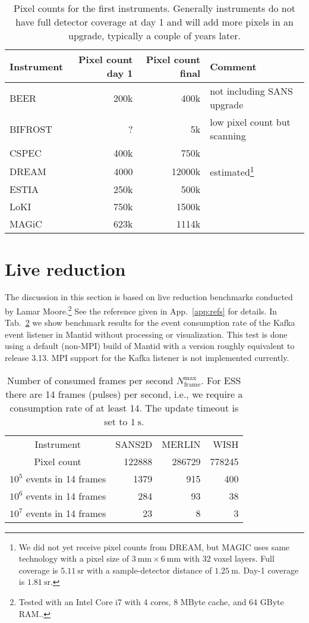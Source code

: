 \documentclass[a4paper,english,numbers=noenddot,bibliography=totoc,chapterprefix=on,DIV=12]{scrartcl}
\newcommand{\beer}{BEER\xspace}
\newcommand{\bifrost}{BIFROST\xspace}
\newcommand{\cspec}{CSPEC\xspace}
\newcommand{\dream}{DREAM\xspace}
\newcommand{\estia}{ESTIA\xspace}
\newcommand{\loki}{LoKI\xspace}
\newcommand{\magic}{MAGiC\xspace}
\newcommand{\mantid}{Mantid\xspace}
\begin{document}
\begin{table}
  \centering
  \begin{tabular}{lrrl}
    Instrument & Pixel count day 1 & Pixel count final & Comment\\
    \hline
    \beer & 200k & 400k & not including SANS upgrade\\
    \bifrost & ? & 5k & low pixel count but scanning\\
    \cspec & 400k & 750k \\
    \dream & 4000 & 12000k & estimated\footnote{We did not yet receive pixel counts from DREAM, but MAGIC uses same technology with a pixel size of $3~\mathrm{mm} \times 6~\mathrm{mm}$ with 32 voxel layers. Full coverage is $5.11~\mathrm{sr}$ with a sample-detector distance of $1.25~\mathrm{m}$. Day-1 coverage is $1.81~\mathrm{sr}$.}\\
    \estia & 250k & 500k \\
    \loki & 750k & 1500k \\
    \magic & 623k & 1114k \\
  \end{tabular}
  \caption{\label{tab:pixel-counts}Pixel counts for the first instruments. Generally instruments do not have full detector coverage at day 1 and will add more pixels in an upgrade, typically a couple of years later.}
\end{table}




\section{Live reduction}

The discussion in this section is based on live reduction benchmarks conducted by Lamar Moore.\footnote{Tested with an Intel Core i7 with 4 cores, 8 MByte cache, and 64 GByte RAM..}
See the reference given in App.~\ref{app:refs} for details.
In Tab.~\ref{tab:consumption-rate} we show benchmark results for the event consumption rate of the Kafka event listener in \mantid without processing or visualization.
This test is done using a default (non-MPI) build of \mantid with a version roughly equivalent to release 3.13.
MPI support for the Kafka listener is not implemented currently.

\begin{table}
  \centering
  \begin{tabular}{c|rrr}
    Instrument & SANS2D & MERLIN & WISH\\
    Pixel count & 122888 & 286729 & 778245\\
    \hline
    $10^5$ events in 14 frames & 1379 & 915 & 400 \\
    $10^6$ events in 14 frames & 284 & 93 & 38 \\
    $10^7$ events in 14 frames & 23 & 8 & 3 \\
  \end{tabular}
  \caption{\label{tab:consumption-rate}Number of consumed frames per second $N_{\text{frame}}^{\text{max}}$. For ESS there are 14 frames (pulses) per second, i.e., we require a consumption rate of at least 14. The update timeout is set to $1~\mathrm{s}$.}
\end{table}
\end{document}

